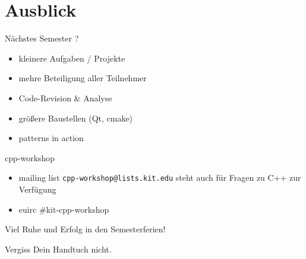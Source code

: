 \section{Ausblick}


\begin{frame}{Nächstes Semester}
	?
	
	\begin{itemize}
		\item kleinere Aufgaben / Projekte
		\item mehre Beteiligung aller Teilnehmer
		\item Code-Revision \& Analyse
		\item größere Baustellen (Qt, cmake)
		\item patterns in action
	\end{itemize}
\end{frame}

\begin{frame}{cpp-workshop}
	\begin{itemize}
		\item mailing list \texttt{cpp-workshop@lists.kit.edu} steht auch für Fragen zu C++ zur Verfügung
		\item euirc \#kit-cpp-workshop
	\end{itemize}
	
	\vspace{1em}
	
	Viel Ruhe und Erfolg in den Semesterferien!
	
	Vergiss Dein Handtuch nicht.
\end{frame}
